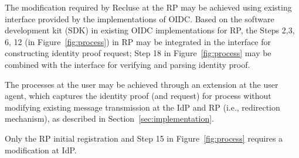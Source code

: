 The modification required by Recluse at the RP may be achieved using existing interface provided by the implementations of OIDC. Based on the software development kit (SDK) in existing OIDC implementations for RP, the Steps 2,3, 6, 12 (in Figure~\ref{fig:process}) in RP may be integrated in the interface for constructing identity proof request;
Step 18 in Figure~\ref{fig:process} may be combined with the interface for verifying and parsing identity proof.

The processes at the user may be achieved through an extension at the user agent, which captures the identity proof (and request) for process  without modifying existing message transmission at the IdP and RP (i.e., redirection mechanism), as described in Section~\ref{sec:implementation}.


Only the RP initial registration and Step 15 in Figure~\ref{fig:process} requires a modification at IdP.


